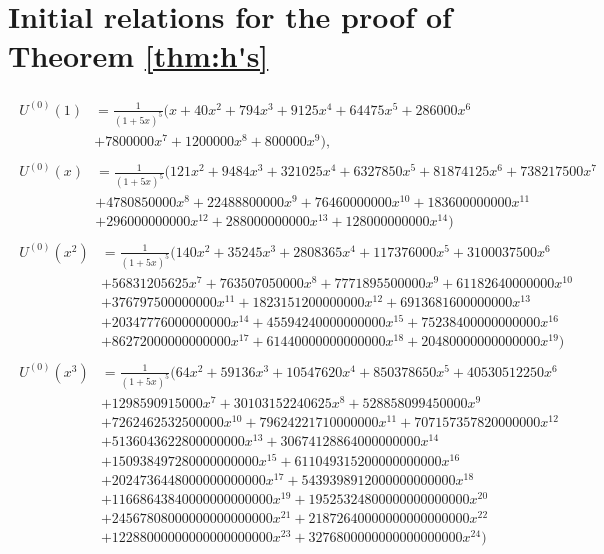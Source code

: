 \documentclass[12pt, reqno]{amsart}
\theoremstyle{definition}
\theoremstyle{remark}
\begin{document}
\section{Initial relations for the proof of Theorem \ref{thm:h's}}\label{app}
\begin{align*}
\begin{split}
U^{(0)}(1) &= \frac{1}{(1+5x)^5} (x+40x^2+794x^3+9125x^4+64475x^5+286000x^6 \\&+7800000x^7+1200000x^8+800000x^9),
\end{split} \\
\begin{split}
U^{(0)}(x) &= \frac{1}{(1+5x)^5}(121x^2+9484x^3+321025x^4+6327850x^5+81874125x^6+738217500x^7 \\ 
&+ 4780850000x^8+22488800000x^9+76460000000x^{10}+183600000000x^{11} \\
&+ 296000000000x^{12} + 288000000000x^{13} + 128000000000x^{14}) \end{split} \\
\begin{split} 
U^{(0)}(x^2) &= \frac{1}{(1+5x)^5} (140x^2 + 35245x^3 +2808365x^4 +117376000x^5 + 3100037500x^6 \\
&+ 56831205625x^7 + 763507050000x^8 + 7771895500000x^9 +61182640000000x^{10}\\
&+  376797500000000x^{11} +1823151200000000x^{12}  + 6913681600000000x^{13} \\
&+ 20347776000000000x^{14}+ 45594240000000000x{^15} + 75238400000000000x^{16}\\
&+ 86272000000000000x^{17} + 61440000000000000x^{18} + 20480000000000000x^{19})
\end{split}\\
\begin{split}
U^{(0)}(x^3) &= \frac{1}{(1+5x)^5}( 64 x^{2}+59136 x^{3}+10547620 x^{4}+850378650 x^{5}+40530512250 x^{6}\\
&+1298590915000x^7 +30103152240625 x^{8}+528858099450000 x^{9}\\
&+7262462532500000 x^{10}+79624221710000000x^{11} +707157357820000000 x^{12}\\
&+5136043622800000000 x^{13}+30674128864000000000 x^{14}\\
&+150938497280000000000x^{15} +611049315200000000000 x^{16}\\
&+2024736448000000000000 x^{17} +5439398912000000000000 x^{18}\\
&+11668643840000000000000x^{19} +19525324800000000000000 x^{20} \\
&+24567808000000000000000x^{21} +21872640000000000000000x^{22} \\
&+12288000000000000000000 x^{23} +3276800000000000000000 x^{24})  
\end{split} 
\end{align*}
\end{document}
